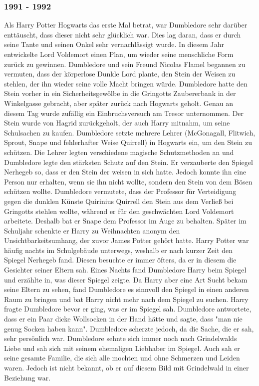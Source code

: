 \documentclass[a4paper, 10pt]{article}
\begin{document}
\subsubsection*{1991 - 1992}
Als Harry Potter Hogwarts das erste Mal betrat, war Dumbledore sehr darüber enttäuscht, dass dieser nicht sehr glücklich war. Dies lag daran, dass er durch seine Tante und seinen Onkel sehr vernachlässigt wurde. In diesem Jahr entwickelte Lord Voldemort einen Plan, um wieder seine menschliche Form zurück zu gewinnen. Dumbledore und sein Freund Nicolas Flamel begannen zu vermuten, dass der körperlose Dunkle Lord plante, den Stein der Weisen zu stehlen, der ihn wieder seine volle Macht bringen würde. Dumbledore hatte den Stein vorher in ein Sicherheitsgewölbe in die Gringotts Zaubererbank in der Winkelgasse gebracht, aber später zurück nach Hogwarts geholt. Genau an diesem Tag wurde zufällig ein Einbruchsversuch am Tresor unternommen. Der Stein wurde von Hagrid zurückgeholt, der auch Harry mitnahm, um seine Schulsachen zu kaufen.
\vspace{10pt}
\newline
Dumbledore setzte mehrere Lehrer (McGonagall, Flitwich, Sprout, Snape und fehlerhafter Weise Quirrell) in Hogwarts ein, um den Stein zu schützen. Die Lehrer legten verschiedene magische Schutzmethoden an und Dumbledore legte den stärksten
Schutz auf den Stein. Er verzauberte den Spiegel Nerhegeb so, dass er den Stein der weisen in sich hatte. Jedoch konnte ihn eine Person nur erhalten, wenn sie ihn nicht wollte, sondern den Stein von dem Bösen schützen wollte. Dumbledore vermutete, dass der Professor für Verteidigung gegen die dunklen Künste Quirinius Quirrell den Stein aus dem Verließ bei Gringotts stehlen wollte, während er für den geschwächten Lord Voldemort arbeitete. Deshalb bat er Snape dem Professor im Auge zu behalten. Später im Schuljahr schenkte er Harry zu Weihnachten anonym den Unsichtbarkeitsumhang, der zuvor James Potter gehört hatte.
\vspace{10pt}
\newline
Harry Potter war häufig nachts im Schulgebäude unterwegs, weshalb er nach kurzer Zeit den Spiegel Nerhegeb fand. Diesen besuchte er immer öfters, da er in diesem die Gesichter seiner Eltern sah. Eines Nachts fand Dumbledore Harry beim Spiegel und erzählte in, was dieser Spiegel zeigte. Da Harry aber eine Art Sucht bekam seine Eltern zu sehen, fand Dumbledore es sinnvoll den Spiegel in einen anderen Raum zu bringen und bat Harry nicht mehr nach dem Spiegel zu suchen. Harry fragte Dumbledore bevor er ging, was er im Spiegel sah. Dumbledore antwortete, dass er ein Paar dicke Wollsocken in der Hand hätte und sagte, dass "man nie genug Socken haben kann". Dumbledore scherzte jedoch, da die Sache, die er sah, sehr persönlich war. Dumbledore sehnte sich immer noch nach Grindelwalds Liebe und sah sich mit seinem ehemaligen Liebhaber im Spiegel. Auch sah er seine gesamte Familie, die sich alle mochten und ohne Schmerzen und Leiden waren. Jedoch ist nicht bekannt, ob er auf diesem Bild mit Grindelwald in einer Beziehung war.
\end{document}
